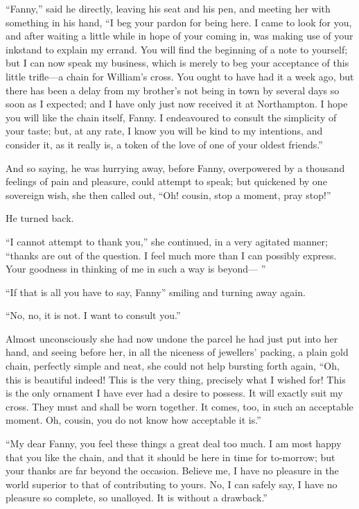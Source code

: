 ``Fanny,'' said he directly, leaving his seat and his pen,
and meeting her with something in his hand, ``I beg
your pardon for being here.  I came to look for you,
and after waiting a little while in hope of your coming in,
was making use of your inkstand to explain my errand.
You will find the beginning of a note to yourself;
but I can now speak my business, which is merely to beg
your acceptance of this little trifle---a chain for
William's cross.  You ought to have had it a week ago,
but there has been a delay from my brother's not
being in town by several days so soon as I expected;
and I have only just now received it at Northampton.
I hope you will like the chain itself, Fanny.  I endeavoured
to consult the simplicity of your taste; but, at any rate,
I know you will be kind to my intentions, and consider it,
as it really is, a token of the love of one of your
oldest friends.''

And so saying, he was hurrying away, before Fanny,
overpowered by a thousand feelings of pain and pleasure,
could attempt to speak; but quickened by one sovereign wish,
she then called out, ``Oh! cousin, stop a moment,
pray stop!''

He turned back.

``I cannot attempt to thank you,'' she continued, in a
very agitated manner; ``thanks are out of the question.
I feel much more than I can possibly express.
Your goodness in thinking of me in such a way is beyond---%
''

``If that is all you have to say, Fanny'' smiling and turning
away again.

``No, no, it is not.  I want to consult you.''

Almost unconsciously she had now undone the parcel he
had just put into her hand, and seeing before her,
in all the niceness of jewellers' packing, a plain
gold chain, perfectly simple and neat, she could not help
bursting forth again, ``Oh, this is beautiful indeed!
This is the very thing, precisely what I wished for!
This is the only ornament I have ever had a desire to possess.
It will exactly suit my cross.  They must and shall be
worn together.  It comes, too, in such an acceptable moment.
Oh, cousin, you do not know how acceptable it is.''

``My dear Fanny, you feel these things a great deal too much.
I am most happy that you like the chain, and that it
should be here in time for to-morrow; but your thanks are
far beyond the occasion.  Believe me, I have no pleasure
in the world superior to that of contributing to yours.
No, I can safely say, I have no pleasure so complete,
so unalloyed.  It is without a drawback.''

